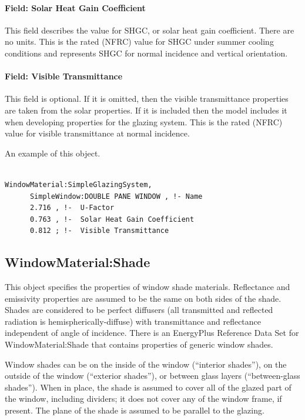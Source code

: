 \paragraph{Field: Solar Heat Gain Coefficient}\label{field-solar-heat-gain-coefficient}

This field describes the value for SHGC, or solar heat gain coefficient. There are no units. This is the rated (NFRC) value for SHGC under summer cooling conditions and represents SHGC for normal incidence and vertical orientation.

\paragraph{Field: Visible Transmittance}\label{field-visible-transmittance}

This field is optional. If it is omitted, then the visible transmittance properties are taken from the solar properties. If it is included then the model includes it when developing properties for the glazing system. This is the rated (NFRC) value for visible transmittance at normal incidence.

An example of this object.

\begin{lstlisting}

WindowMaterial:SimpleGlazingSystem,
      SimpleWindow:DOUBLE PANE WINDOW , !- Name
      2.716 , !-  U-Factor
      0.763 , !-  Solar Heat Gain Coefficient
      0.812 ; !-  Visible Transmittance
\end{lstlisting}

\subsection{WindowMaterial:Shade}\label{windowmaterialshade}

This object specifies the properties of window shade materials. Reflectance and emissivity properties are assumed to be the same on both sides of the shade. Shades are considered to be perfect diffusers (all transmitted and reflected radiation is hemispherically-diffuse) with transmittance and reflectance independent of angle of incidence. There is an EnergyPlus Reference Data Set for WindowMaterial:Shade that contains properties of generic window shades.

Window shades can be on the inside of the window (``interior shades''), on the outside of the window (``exterior shades''), or between glass layers (``between-glass shades''). When in place, the shade is assumed to cover all of the glazed part of the window, including dividers; it does not cover any of the window frame, if present. The plane of the shade is assumed to be parallel to the glazing.

